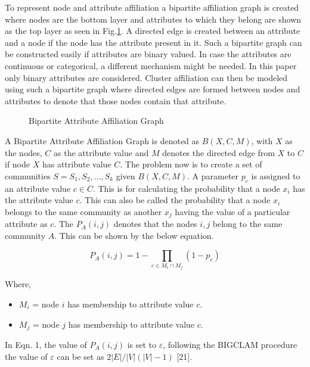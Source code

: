 To represent node and attribute affiliation a bipartite
affiliation graph is created where nodes are the bottom layer
and attributes to which they belong are shown as the top
layer as seen in Fig.\ref{fig 1}. A directed edge is created between an attribute and a node if the node has the attribute present in it. Such a bipartite graph can be constructed easily if attributes are binary valued. In case the attributes are continuous or categorical, a different mechanism might be needed. In this paper only binary attributes are considered. Cluster affiliation can then be modeled using such a
bipartite graph where directed edges are formed between
nodes and attributes to denote that those nodes contain
that attribute. \\

\begin{figure}[H]
\centering
{}
\caption{Bipartite Attribute Affiliation Graph}
\label{fig 1}
\end{figure}

A Bipartite Attribute Affiliation Graph is denoted as $B(X,C,M)$,
with $X$ as the nodes, $C$ as the attribute value and $M$ denotes
the directed edge from $X$ to $C$ if node $X$ has attribute
value $C$. The problem now is to create a set of communities
$S = S_1, S_2, ..., S_k$ given $B(X,C,M)$. A parameter $p_c$ is
assigned to an attribute value $c \in C$. This is for calculating
the probability that a node $x_i$ has the attribute value $c$. This
can also be called the probability that a node $x_i$ belongs to
the same community as another $x_j$ having the value of a
particular attribute as $c$. The $P_A(i, j)$ denotes that the nodes
$i, j$ belong to the same community $A$. This can be shown by
the below equation.

\begin{equation}
P_A(i,j) = 1 - \prod_{c \in M_i \cap M_j} (1 - p_c)
\end{equation} 

Where,

\begin{itemize}
\item $M_i$ = node $i$ has membership to attribute value $c$.
\item $M_j$ = node $j$ has membership to attribute value $c$.\\
\end{itemize}

In Eqn. 1, the value of $P_A(i, j)$ is set to $\varepsilon$, following
the BIGCLAM procedure the value of $\varepsilon$ can be set as
$2|E|/|V|(|V| - 1)$ [21].


